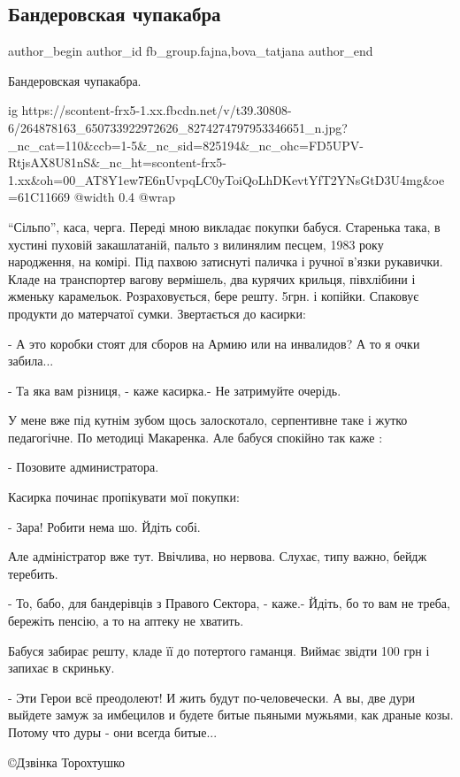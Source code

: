  
 
 
 
 
 
\subsection{Бандеровская чупакабра}
\label{sec:09_12_2021.fb.fb_group.fajna.1.bander_chupakabra}
 
\ifcmt
 author_begin
   author_id fb_group.fajna,bova_tatjana
 author_end
\fi

Бандеровская чупакабра.

\ifcmt
  ig https://scontent-frx5-1.xx.fbcdn.net/v/t39.30808-6/264878163_650733922972626_8274274797953346651_n.jpg?_nc_cat=110&ccb=1-5&_nc_sid=825194&_nc_ohc=FD5UPV-RtjsAX8U81nS&_nc_ht=scontent-frx5-1.xx&oh=00_AT8Y1ew7E6nUvpqLC0yToiQoLhDKevtYfT2YNsGtD3U4mg&oe=61C11669
  @width 0.4
  @wrap 
\fi

\enquote{Сільпо}, каса, черга. Переді мною викладає покупки бабуся. Старенька така, в
хустині пуховій закашлатаній, пальто з вилинялим песцем, 1983 року народження,
на комірі. Під пахвою затиснуті паличка і ручної в'язки рукавички. Кладе на
транспортер вагову вермішель, два курячих крильця, півхлібини і жменьку
карамельок. Розраховується, бере решту. 5грн. і копійки. Спаковує продукти до
матерчатої сумки. Звертається до касирки:

- А это коробки стоят для сборов на Армию или на инвалидов? А то я очки
забила...

- Та яка вам різниця, - каже касирка.- Не затримуйте очерідь.

У мене вже під кутнім зубом щось залоскотало, серпентивне таке і жутко
педагогічне. По методиці Макаренка. Але бабуся спокійно так каже :

- Позовите администратора.

Касирка починає пропікувати мої покупки:

- Зара! Робити нема шо. Йдіть собі.

Але адміністратор вже тут. Ввічлива, но нервова. Слухає, типу важно, бейдж
теребить.

- То, бабо, для бандерівців з Правого Сектора, - каже.- Йдіть, бо то вам не
треба, бережіть пенсію, а то на аптеку не хватить.

Бабуся забирає решту, кладе її до потертого гаманця. Виймає звідти 100 грн і
запихає в скриньку.

- Эти Герои всё преодолеют! И жить будут по-человечески. А вы, две дури выйдете
замуж за имбецилов и будете битые пьяными мужьями, как драные козы. Потому что
дуры - они всегда битые...

©Дзвінка Торохтушко

